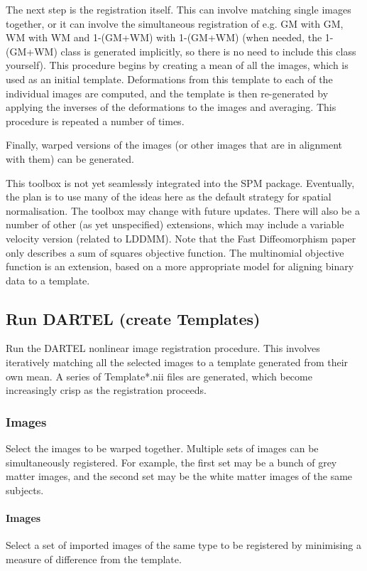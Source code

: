 The next step is the registration itself.  This can involve matching single images together, or it can involve the simultaneous registration of e.g. GM with GM, WM with WM and 1-(GM+WM) with 1-(GM+WM) (when needed, the 1-(GM+WM) class is generated implicitly, so there is no need to include this class yourself). This procedure begins by creating a mean of all the images, which is used as an initial template. Deformations from this template to each of the individual images are computed, and the template is then re-generated by applying the inverses of the deformations to the images and averaging. This procedure is repeated a number of times.

Finally, warped versions of the images (or other images that are in alignment with them) can be generated. 



This toolbox is not yet seamlessly integrated into the SPM package. Eventually, the plan is to use many of the ideas here as the default strategy for spatial normalisation. The toolbox may change with future updates.  There will also be a number of other (as yet unspecified) extensions, which may include a variable velocity version (related to LDDMM). Note that the Fast Diffeomorphism paper only describes a sum of squares objective function. The multinomial objective function is an extension, based on a more appropriate model for aligning binary data to a template.


\subsection{Run DARTEL (create Templates)}
Run the DARTEL nonlinear image registration procedure. This involves iteratively matching all the selected images to a template generated from their own mean. A series of Template*.nii files are generated, which become increasingly crisp as the registration proceeds.


\subsubsection{Images}
Select the images to be warped together. Multiple sets of images can be simultaneously registered. For example, the first set may be a bunch of grey matter images, and the second set may be the white matter images of the same subjects.


\paragraph{Images}
Select a set of imported images of the same type to be registered by minimising a measure of difference from the template.


